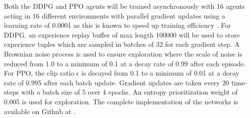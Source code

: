 Both the DDPG and PPO agents will be trained asynchronously with 16 agents acting in 16 different environments with parallel gradient updates using a learning rate of 0.0001 as this is known to speed up training efficiency \cite{2.2.1}. For DDPG, an experience replay buffer of max length 100000 will be used to store experience tuples which are sampled in batches of 32 for each gradient step. A Brownian noise process is used to ensure exploration where the scale of noise is reduced from 1.0 to a minimum of 0.1 at a decay rate of 0.99 after each episode. For PPO, the clip ratio $\epsilon$ is decayed from 0.1 to a minimum of 0.01 at a decay rate of 0.995 after each batch update. Gradient updates are taken every 20 time-steps with a batch size of 5 over 4 epochs. An entropy prioritization weight of 0.005 is used for exploration. The complete implementation of the networks is available on Github at \cite{Git}.